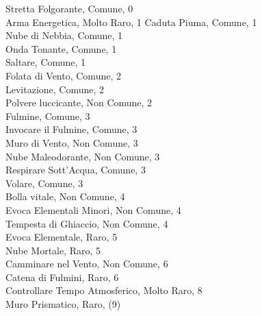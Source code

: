 \begin{multicols}{3}
Stretta Folgorante, Comune, 0\\
Arma Energetica, Molto Raro, 1
Caduta Piuma, Comune, 1\\
Nube di Nebbia, Comune, 1\\
Onda Tonante, Comune, 1\\
Saltare, Comune, 1\\
Folata di Vento, Comune, 2\\
Levitazione, Comune, 2\\
Polvere luccicante, Non Comune, 2\\
Fulmine, Comune, 3\\
Invocare il Fulmine, Comune, 3\\
Muro di Vento, Non Comune, 3\\
Nube Maleodorante, Non Comune, 3\\
Respirare Sott'Acqua, Comune, 3\\
Volare, Comune, 3\\
Bolla vitale, Non Comune, 4\\
Evoca Elementali Minori, Non Comune, 4\\
Tempesta di Ghiaccio, Non Comune, 4\\
Evoca Elementale, Raro, 5\\
Nube Mortale, Raro, 5\\
Camminare nel Vento, Non Comune, 6\\
Catena di Fulmini, Raro, 6\\
Controllare Tempo Atmosferico, Molto Raro, 8\\
Muro Prismatico, Raro, (9)\\




\end{multicols}
